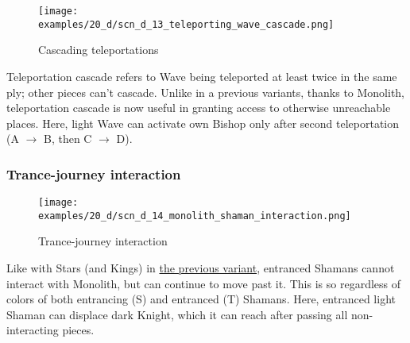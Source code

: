 \vspace*{-0.9\baselineskip}
\noindent
\begin{figure}[!h]
\texttt{[image: examples/20\_d/scn\_d\_13\_teleporting\_wave\_cascade.png]}
\caption{Cascading teleportations}
\label{fig:scn_d_13_teleporting_wave_cascade}
\end{figure}

Teleportation cascade refers to Wave being teleported at least twice in the same ply;
other pieces can't cascade. Unlike in a previous variants, thanks to Monolith,
teleportation cascade is now useful in granting access to otherwise unreachable places.
Here, light Wave can activate own Bishop only after second teleportation
(A $\rightarrow$ B, then C $\rightarrow$ D).

\clearpage %

\subsubsection*{Trance-journey interaction}

\vspace*{-0.9\baselineskip}
\noindent
\begin{figure}[!h]
\texttt{[image: examples/20\_d/scn\_d\_14\_monolith\_shaman\_interaction.png]}
\caption{Trance-journey interaction}
\label{fig:scn_d_14_monolith_shaman_interaction}
\end{figure}

Like with Stars (and Kings) in \hyperref[fig:scn_cot_18_light_light_shaman_interaction_start]{the previous variant},
entranced Shamans cannot interact with Monolith, but can continue to move past it. This is so regardless of colors
of both entrancing (S) and entranced (T) Shamans. Here, entranced light Shaman can displace dark Knight, which it
can reach after passing all non-interacting pieces.

\clearpage %

